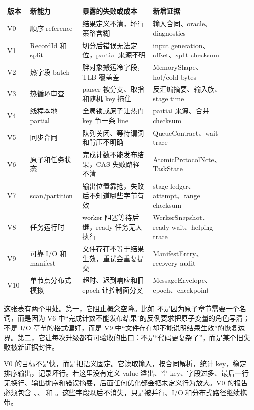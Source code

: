 \begin{center}
\small
\begin{tabular}{@{}p{0.10\linewidth}p{0.23\linewidth}p{0.31\linewidth}p{0.26\linewidth}@{}}
\toprule
版本 & 新能力 & 暴露的失败或成本 & 新增证据 \\
\midrule
V0 & 顺序 reference & 结果定义不清，坏行策略含糊 & 输入合同、oracle、diagnostics \\
V1 & RecordId 和 split & 切分后错误无法定位，partial 来源不明 & input generation、offset、split checksum \\
V2 & 热字段 batch & 胖对象搬运冷字段，TLB 覆盖差 & MemoryShape、hot/cold bytes \\
V3 & 热循环审查 & parser 被分支、取指和随机 key 拖住 & 反汇编摘要、输入族、stage time \\
V4 & 线程本地 partial & 全局锁或原子让热门 key 争一条 line & partial 来源、合并 checksum \\
V5 & 同步合同 & 队列关闭、等待谓词和背压不明确 & QueueContract、wait trace \\
V6 & 原子和任务状态 & 完成计数不能发布结果，CAS 失败路径不清 & AtomicProtocolNote、TaskState \\
V7 & scan/partition & 输出位置靠抢，失败后不知道哪些字节有效 & stage ledger、attempt、range checksum \\
V8 & 任务运行时 & worker 阻塞等待后继，ready 任务无人执行 & WorkerSnapshot、ready wait、helping trace \\
V9 & 可靠 I/O 和 manifest & 文件存在不等于结果生效，重试会重复提交 & ManifestEntry、recovery audit \\
V10 & 单节点分布式模拟 & 超时、迟到响应和旧 epoch 让控制面分叉 & MessageEnvelope、epoch、checkpoint \\
\bottomrule
\end{tabular}
\end{center}

这张表有两个用处。第一，它阻止概念空降。比如  不是因为原子章节需要一个名词，而是因为 V6 中“完成计数不能发布结果”的反例要求把原子变量的角色写清； 不是 I/O 章节的格式偏好，而是 V9 中“文件存在却不能说明结果生效”的恢复边界。第二，它让每次升级都有可验收的出口：不是“代码更复杂了”，而是某个旧失败被新证据封住。

V0 的目标不是快，而是把语义固定。它读取输入，按合同解析，统计 key，稳定排序输出，记录坏行。若这里没有定义 value 溢出、空 key、字段过多、最后一行无换行、输出排序和错误摘要，后面任何优化都会把未定义行为放大。V0 的报告必须包含 、、 和 。这些字段以后不消失，只是被并行、I/O 和分布式路径继续携带。

